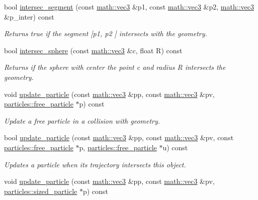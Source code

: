 \begin{DoxyCompactItemize}
bool \hyperlink{classphysim_1_1geometry_1_1object_a0bec6c92c99ed911975e9723416f8a15}{intersec\+\_\+segment} (const \hyperlink{structphysim_1_1math_1_1vec3}{math\+::vec3} \&p1, const \hyperlink{structphysim_1_1math_1_1vec3}{math\+::vec3} \&p2, \hyperlink{structphysim_1_1math_1_1vec3}{math\+::vec3} \&p\+\_\+inter) const
\begin{DoxyCompactList}\small\item\em Returns true if the segment \mbox{[}{\itshape p1}, {\itshape p2} \mbox{]} intersects with the geometry. \end{DoxyCompactList}\item 
bool \hyperlink{classphysim_1_1geometry_1_1object_a64a776ad5833e2b90fdd4b7a0567c67a}{intersec\+\_\+sphere} (const \hyperlink{structphysim_1_1math_1_1vec3}{math\+::vec3} \&c, float R) const
\begin{DoxyCompactList}\small\item\em Returns if the sphere with center the point {\itshape c} and radius {\itshape R} intersects the geometry. \end{DoxyCompactList}\item 
void \hyperlink{classphysim_1_1geometry_1_1object_a7d907cfc731a8ccd2f112e53efe81ab8}{update\+\_\+particle} (const \hyperlink{structphysim_1_1math_1_1vec3}{math\+::vec3} \&pp, const \hyperlink{structphysim_1_1math_1_1vec3}{math\+::vec3} \&pv, \hyperlink{classphysim_1_1particles_1_1free__particle}{particles\+::free\+\_\+particle} $\ast$p) const
\begin{DoxyCompactList}\small\item\em Update a free particle in a collision with geometry. \end{DoxyCompactList}\item 
bool \hyperlink{classphysim_1_1geometry_1_1object_a71c27629c71e89ac1452e72435552e02}{update\+\_\+particle} (const \hyperlink{structphysim_1_1math_1_1vec3}{math\+::vec3} \&pp, const \hyperlink{structphysim_1_1math_1_1vec3}{math\+::vec3} \&pv, const \hyperlink{classphysim_1_1particles_1_1free__particle}{particles\+::free\+\_\+particle} $\ast$p, \hyperlink{classphysim_1_1particles_1_1free__particle}{particles\+::free\+\_\+particle} $\ast$u) const
\begin{DoxyCompactList}\small\item\em Updates a particle when its trajectory intersects this object. \end{DoxyCompactList}\item 
void \hyperlink{classphysim_1_1geometry_1_1object_a4604a2f28509e8a1d10bf7bb4a2a66db}{update\+\_\+particle} (const \hyperlink{structphysim_1_1math_1_1vec3}{math\+::vec3} \&pp, const \hyperlink{structphysim_1_1math_1_1vec3}{math\+::vec3} \&pv, \hyperlink{classphysim_1_1particles_1_1sized__particle}{particles\+::sized\+\_\+particle} $\ast$p) const

\end{DoxyCompactItemize}

